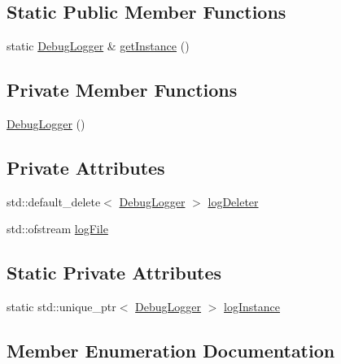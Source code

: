 \subsection*{Static Public Member Functions}
\begin{DoxyCompactItemize}
\item 
static \hyperlink{class_ori_engine_1_1_debug_logger}{Debug\+Logger} \& \hyperlink{class_ori_engine_1_1_debug_logger_a4005bb3158755d94376f1f45ac36dbbe}{get\+Instance} ()
\end{DoxyCompactItemize}
\subsection*{Private Member Functions}
\begin{DoxyCompactItemize}
\item 
\hyperlink{class_ori_engine_1_1_debug_logger_a8d6cd2c43a93f46d0b19c737a88765a5}{Debug\+Logger} ()
\end{DoxyCompactItemize}
\subsection*{Private Attributes}
\begin{DoxyCompactItemize}
\item 
std\+::default\+\_\+delete$<$ \hyperlink{class_ori_engine_1_1_debug_logger}{Debug\+Logger} $>$ \hyperlink{class_ori_engine_1_1_debug_logger_ae86b0220c28dba347069ffd1b8d119f6}{log\+Deleter}
\item 
std\+::ofstream \hyperlink{class_ori_engine_1_1_debug_logger_a23007f95260fd62728a4828b9d5af54a}{log\+File}
\end{DoxyCompactItemize}
\subsection*{Static Private Attributes}
\begin{DoxyCompactItemize}
\item 
static std\+::unique\+\_\+ptr$<$ \hyperlink{class_ori_engine_1_1_debug_logger}{Debug\+Logger} $>$ \hyperlink{class_ori_engine_1_1_debug_logger_a4ce97f44559d7b62a2e6a535b34ce3f5}{log\+Instance}
\end{DoxyCompactItemize}


\subsection{Member Enumeration Documentation}
\hypertarget{class_ori_engine_1_1_debug_logger_a3ac0c97517b3aecb4ea7bdb5b98e6fe5}{}\label{class_ori_engine_1_1_debug_logger_a3ac0c97517b3aecb4ea7bdb5b98e6fe5} 
